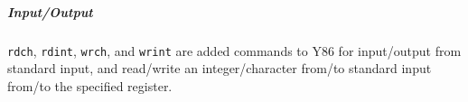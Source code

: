\documentclass[11pt]{article}
\begin{document}
	\subparagraph{Input/Output} \verb|rdch|, \verb|rdint|, \verb|wrch|, and \verb|wrint| are added commands to Y86 for input/output from standard input, and read/write an integer/character from/to standard input from/to the specified register.
	

%		
%		


\end{document}
